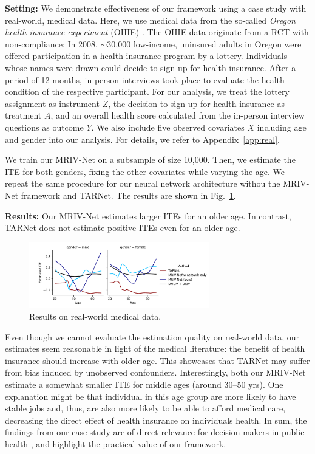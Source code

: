 \documentclass[nonatbib]{article}
\newcommand{\modelname}{\mbox{MRIV-Net}\xspace}
\theoremstyle{definition}
\theoremstyle{plain}
\begin{document}
\textbf{Setting:} We demonstrate effectiveness of our framework using a case study with real-world, medical data. Here, we use medical data from the so-called \emph{Oregon health insurance experiment} (OHIE) \cite{Finkelstein.2012}. The OHIE data originate from a RCT with non-compliance: In 2008, $\sim$30,000 low-income, uninsured adults in Oregon were offered participation in a health insurance program by a lottery. Individuals whose names were drawn could decide to sign up for health insurance. After a period of 12 months, in-person interviews took place to evaluate the health condition of the respective participant. For our analysis, we treat the lottery assignment as instrument $Z$, the decision to sign up for health insurance as treatment $A$, and an overall health score calculated from the in-person interview questions as outcome $Y$. We also include five observed covariates $X$ including age and gender into our analysis. For details, we refer to Appendix~\ref*{app:real}.

We train our \modelname on a subsample of size 10,000. Then, we estimate the ITE for both genders, fixing the other covariates while varying the age. We repeat the same procedure for our neural network architecture withou the \modelname framework and TARNet. The results are shown in Fig.~\ref{fig:real}.

\textbf{Results:} Our \modelname estimates larger ITEs for an older age. In contrast, TARNet does not estimate positive ITEs even for an older age. 
\begin{figure}
\vspace{-0.4cm}
 \begin{center}
\includegraphics[width=0.7\textwidth]{img/plot_real.pdf}
\end{center}
\vspace{-0.5cm}
\caption{Results on real-world medical data.}
\vspace{-0.7cm}
\label{fig:real}
\end{figure}
Even though we cannot evaluate the estimation quality on real-world data, our estimates seem reasonable in light of the medical literature: the benefit of health insurance should increase with older age. This showcases that TARNet may suffer from bias induced by unobserved confounders. Interestingly, both our \modelname estimate a somewhat smaller ITE for middle ages (around 30--50 yrs). One explanation might be that individual in this age group are more likely to have stable jobs and, thus, are also more likely to be able to afford medical care, decreasing the direct effect of health insurance on individuals health. In sum, the findings from our case study are of direct relevance for decision-makers in public health \cite{Imbens.1994}, and highlight the practical value of our framework.
\end{document}
